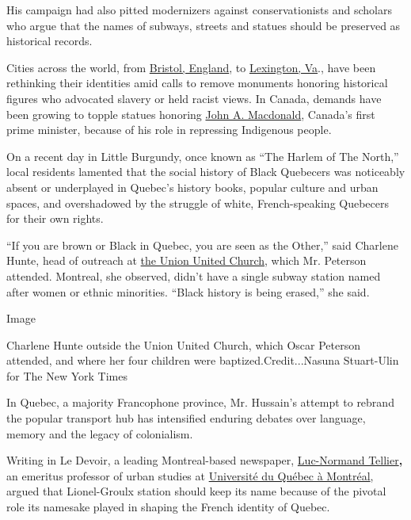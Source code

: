 His campaign had also pitted modernizers against conservationists and
scholars who argue that the names of subways, streets and statues should
be preserved as historical records.

Cities across the world, from
\href{https://www.nytimes3xbfgragh.onion/2020/06/14/world/europe/Bristol-Colston-statue-slavery.html}{Bristol,
England}, to
\href{https://www.nytimes3xbfgragh.onion/2020/07/26/us/politics/lexington-va-confederate-generals.html}{Lexington,
Va}., have been rethinking their identities amid calls to remove
monuments honoring historical figures who advocated slavery or held
racist views. In Canada, demands have been growing to topple statues
honoring
\href{https://www.nytimes3xbfgragh.onion/2017/08/28/world/americas/canada-john-a-macdonald-kingston.html}{John
A. Macdonald}, Canada's first prime minister, because of his role in
repressing Indigenous people.

On a recent day in Little Burgundy, once known as ``The Harlem of The
North,'' local residents lamented that the social history of Black
Quebecers was noticeably absent or underplayed in Quebec's history
books, popular culture and urban spaces, and overshadowed by the
struggle of white, French-speaking Quebecers for their own rights.

``If you are brown or Black in Quebec, you are seen as the Other,'' said
Charlene Hunte, head of outreach at
\href{http://www.unionunitedchurchmtl.ca/}{the Union United Church},
which Mr. Peterson attended. Montreal, she observed, didn't have a
single subway station named after women or ethnic minorities. ``Black
history is being erased,'' she said.

Image

Charlene Hunte outside the Union United Church, which Oscar Peterson
attended, and where her four children were baptized.Credit...Nasuna
Stuart-Ulin for The New York Times

In Quebec, a majority Francophone province, Mr. Hussain's attempt to
rebrand the popular transport hub has intensified enduring debates over
language, memory and the legacy of colonialism.

Writing in Le Devoir, a leading Montreal-based newspaper,
\href{https://professeurs.uqam.ca/professeur/tellier.luc-n/}{Luc-Normand
Tellier}\textbf{,} an emeritus professor of urban studies at
\href{https://uqam.ca/}{Université du Québec à Montréal}, argued that
Lionel-Groulx station should keep its name because of the pivotal role
its namesake played in shaping the French identity of Quebec.

